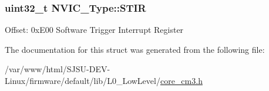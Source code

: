 \subsubsection[{\texorpdfstring{S\+T\+IR}{STIR}}]{ uint32\+\_\+t N\+V\+I\+C\+\_\+\+Type\+::\+S\+T\+IR}\hypertarget{structNVIC__Type_a0b0d7f3131da89c659a2580249432749}{}\label{structNVIC__Type_a0b0d7f3131da89c659a2580249432749}
Offset\+: 0x\+E00 Software Trigger Interrupt Register 

The documentation for this struct was generated from the following file\+:\begin{DoxyCompactItemize}
\item 
/var/www/html/\+S\+J\+S\+U-\/\+D\+E\+V-\/\+Linux/firmware/default/lib/\+L0\+\_\+\+Low\+Level/\hyperlink{core__cm3_8h}{core\+\_\+cm3.\+h}\end{DoxyCompactItemize}
